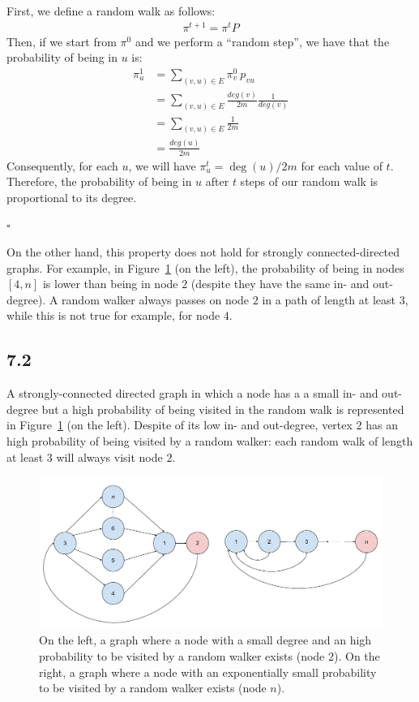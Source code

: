 \documentclass[12pt,a4paper]{article}
\newcommand*{\QEDB}{\hfill\ensuremath{\square}}%
\begin{document}
First, we define a random walk as follows:
\begin{align}
\pi^{t + 1} = \pi^t P
\end{align}
Then, if we start from $\pi^0$ and we perform a ``random step'', we have that the probability of being in $u$ is:
\begin{align}
\pi_u^1 &= \sum_{(v, u) \in E} \pi_v^0\ p_{vu}\\
		&= \sum_{(v, u) \in E} \frac{deg(v)}{2m} \frac{1}{deg(v)}\\
		&= \sum_{(v, u) \in E} \frac{1}{2m}\\
        &= \frac{deg(u)}{2m}
\end{align}
Consequently, for each $u$, we will have $\pi_u^t = \deg(u) / 2m$  for each value of $t$. Therefore, the probability of being in $u$ after $t$ steps of our random walk is proportional to its degree.

\QEDB


On the other hand, this property does not hold for strongly connected-directed graphs. For example, in Figure~\ref{fig:graphprob} (on the left), the probability of being in nodes $[4, n]$ is lower than being in node $2$ (despite they have the same in- and out-degree). A random walker always passes on node $2$ in a path of length at least $3$, while this is not true for example, for node $4$.




\subsection*{7.2}

A strongly-connected directed graph in which a node has a a small in- and out-degree but a high probability of being visited in the random walk is represented in  Figure~\ref{fig:graphprob} (on the left). Despite of its low in- and out-degree, vertex $2$ has an high probability of being visited by a random walker: each random walk of length at least $3$ will always visit node $2$.


\begin{figure}
\centering
\includegraphics[scale=0.6]{graphs.pdf}
\caption{On the left, a graph where a node with a small degree and an high probability to be visited by a random walker exists (node $2$). On the right, a graph where a node with an exponentially small probability to be visited by a random walker exists (node $n$).}
\label{fig:graphprob}
\end{figure}
\end{document}
